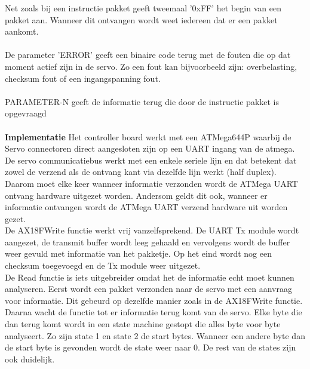 \documentclass[10pt,a4paper]{article}
\begin{document}
Net zoals bij een instructie pakket geeft tweemaal '0xFF' het begin van een pakket aan. Wanneer dit ontvangen wordt weet iedereen dat er een pakket aankomt.\\\\

De parameter 'ERROR' geeft een binaire code terug met de fouten die op dat moment actief zijn in de servo. Zo een fout kan bijvoorbeeld zijn: overbelasting, checksum fout of een ingangspanning fout.\\\\
PARAMETER-N geeft de informatie terug die door de instructie pakket is opgevraagd\\\\


\textbf{Implementatie}
Het controller board werkt met een ATMega644P waarbij de Servo connectoren direct aangesloten zijn op een UART ingang van de atmega. De servo communicatiebus werkt met een enkele seriele lijn en dat betekent dat zowel de verzend als de ontvang kant via dezelfde lijn werkt (half duplex). Daarom moet elke keer wanneer informatie verzonden wordt de ATMega UART ontvang hardware uitgezet worden. Andersom geldt dit ook, wanneer er informatie ontvangen wordt de ATMega UART verzend hardware uit worden gezet.\\
De AX18FWrite functie werkt vrij vanzelfsprekend. De UART Tx module wordt aangezet, de transmit buffer wordt leeg gehaald en vervolgens wordt de buffer weer gevuld met informatie van het pakketje. Op het eind wordt nog een checksum toegevoegd en de Tx module weer uitgezet.\\



De Read functie is iets uitgebreider omdat het de informatie echt moet kunnen analyseren. Eerst wordt een pakket verzonden naar de servo met een aanvraag voor informatie. Dit gebeurd op dezelfde manier zoals in de AX18FWrite functie. Daarna wacht de functie tot er informatie terug komt van de servo. Elke byte die dan terug komt wordt in een state machine gestopt die alles byte voor byte analyseert. Zo zijn state 1 en state 2 de start bytes. Wanneer een andere byte dan de start byte is gevonden wordt de state weer naar 0. De rest van de states zijn ook duidelijk.



\end{document}
